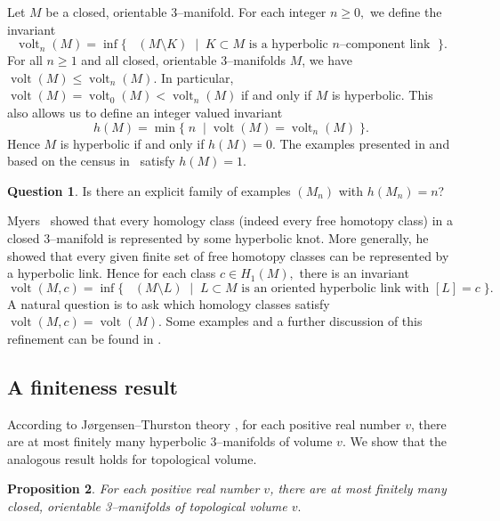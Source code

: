 \documentclass[a4paper]{gtart}
\newtheorem{proposition}{Proposition}[section]
\theoremstyle{definition}
\newtheorem{question}[proposition]{Question}
\theoremstyle{remark}
\numberwithin{equation}{section}
\DeclareMathOperator{\volt}{volt}
\DeclareMathOperator{\volh}{vol_{\mathbb{H}}}
\begin{document}
Let $M$ be a closed, orientable $3$--manifold. For each integer $n\ge 0,$ we define the invariant
\begin{equation}
\volt_n(M) = \inf \big\{ \; \volh(M\setminus K) \;\mid \; K \subset M \text{ is a hyperbolic $n$--component link } \; \big\}.
\end{equation}
For all $n\ge 1$ and all closed, orientable 3--manifolds $M$,
we have $\volt(M)\le \volt_n(M)$. 
In particular, $\volt(M)=\volt_0(M)< \volt_n(M)$ if and only if $M$ is hyperbolic. This also allows us to define an integer valued invariant
\[
h(M) = \min \{ \; n \; \mid \volt(M)= \volt_n(M)\;\}.
\]
Hence $M$ is hyperbolic if and only if $h(M)=0.$ The examples presented in  and based on the census in~\cite{GHMTY21} satisfy $h(M)=1.$

\begin{question}\label{que:unbounded_h(M)}
Is there an explicit family of examples $(M_n)$ with $h(M_n)=n$?
\end{question}

Myers~\cite{My93} showed that every homology class (indeed every free homotopy class) in a closed $3$--manifold is represented by some hyperbolic knot. More generally, he showed that every given finite set of free homotopy classes can be represented by a hyperbolic link. Hence for each class $c \in H_1(M),$ there is an invariant
\begin{equation}
\volt(M, c) = \inf \big\{ \; \volh(M\setminus L) \;\mid \; L \subset M \text{ is an oriented hyperbolic link with } [L]=c\; \big\}.
\end{equation}
A natural question is to ask which homology classes satisfy $\volt(M, c)= \volt(M).$
Some examples and a further discussion of this refinement can be found in .

\subsection{A finiteness result}

According to J\o{}rgensen--Thurston theory \cite{thurston-notes,Gro81, Mai10}, for each positive real number $v$, there are at most finitely many hyperbolic 3--manifolds of volume $v.$ We show that the analogous result holds for topological volume.

\begin{proposition}\label{pro:finiteness}
For each positive real number $v$, there are at most finitely many closed, orientable 3--manifolds of topological volume $v.$
\end{proposition}
\end{document}
